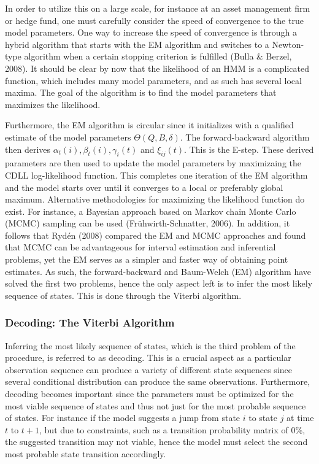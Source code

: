 In order to utilize this on a large scale, for instance at an asset management firm or hedge fund, one must carefully consider the speed of convergence to the true model parameters. One way to increase the speed of convergence is through a hybrid algorithm that starts with the EM algorithm and switches to a Newton-type algorithm when a certain stopping criterion is fulfilled (Bulla \& Berzel, 2008). It should be clear by now that the likelihood of an HMM is a complicated function, which includes many model parameters, and as such has several local maxima. The goal of the algorithm is to find the model parameters that maximizes the likelihood. 

Furthermore, the EM algorithm is circular since it initializes with a qualified estimate of the model parameters $\Theta(Q, B,\delta)$. The forward-backward algorithm then derives $\alpha_t(i), \beta_t(i), \gamma_i(t)$ and $\xi_{ij}(t)$. This is the E-step. These derived parameters are then used to update the model parameters by maximizaing the CDLL log-likelihood function. This completes one iteration of the EM algorithm and the model starts over until it converges to a local or preferably global maximum. Alternative methodologies for maximizing the likelihood function do exist. For instance, a Bayesian approach based on Markov chain Monte Carlo (MCMC) sampling can be used (Frühwirth-Schnatter, 2006). In addition, it follows that Rydén (2008) compared the EM and MCMC approaches and found that MCMC can be advantageous for interval estimation and inferential problems, yet the EM serves as a simpler and faster way of obtaining point estimates. As such, the forward-backward and Baum-Welch (EM) algorithm have solved the first two problems, hence the only aspect left is to infer the most likely sequence of states. This is done through the Viterbi algorithm. 
 
\subsubsection{Decoding: The Viterbi Algorithm}
\label{subsection: Decoding}

Inferring the most likely sequence of states, which is the third problem of the \mle procedure, is referred to as decoding. This is a crucial aspect as a particular observation sequence can produce a variety of different state sequences since several conditional distribution can produce the same observations. Furthermore, decoding becomes important since the parameters must be optimized for the most viable sequence of states and thus not just for the most probable sequence of states. For instance if the model suggests a jump from state $i$ to state $j$ at time $t$ to $t+1$, but due to constraints, such as a transition probability matrix of 0\%, the suggested transition may not viable, hence the model must select the second most probable state transition accordingly. 


